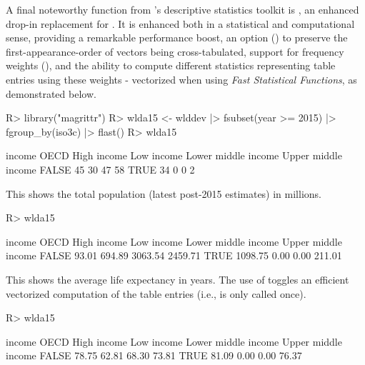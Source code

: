 \documentclass[article]{jss}
\newcommand{\fct}[1]{\code{#1()}}
\begin{document}
A final noteworthy function from 's descriptive statistics toolkit is \fct{qtab}, an enhanced drop-in replacement for . It is enhanced both in a statistical and computational sense, providing a remarkable performance boost, an option () to preserve the first-appearance-order of vectors being cross-tabulated, support for frequency weights (), and the ability to compute different statistics representing table entries using these weights - vectorized when using \emph{Fast Statistical Functions}, as demonstrated below.
%
\begin{Schunk}
\begin{Sinput}
R> library("magrittr")
R> wlda15 <- wlddev |> fsubset(year >= 2015) |> fgroup_by(iso3c) |> flast()
R> wlda15 %$% qtab(OECD, income)
\end{Sinput}
\begin{Soutput}
       income
OECD    High income Low income Lower middle income Upper middle income
  FALSE          45         30                  47                  58
  TRUE           34          0                   0                   2
\end{Soutput}
\end{Schunk}
This shows the total population (latest post-2015 estimates) in millions.
\begin{Schunk}
\begin{Sinput}
R> wlda15 %$% qtab(OECD, income, w = POP) %>% divide_by(1e6)
\end{Sinput}
\begin{Soutput}
       income
OECD    High income Low income Lower middle income Upper middle income
  FALSE       93.01     694.89             3063.54             2459.71
  TRUE      1098.75       0.00                0.00              211.01
\end{Soutput}
\end{Schunk}
This shows the average life expectancy in years. The use of \fct{fmean} toggles an efficient vectorized computation of the table entries (i.e., \fct{fmean} is only called once).
\begin{Schunk}
\begin{Sinput}
R> wlda15 %$% qtab(OECD, income, w = LIFEEX, wFUN = fmean) %>% replace_na(0)
\end{Sinput}
\begin{Soutput}
       income
OECD    High income Low income Lower middle income Upper middle income
  FALSE       78.75      62.81               68.30               73.81
  TRUE        81.09       0.00                0.00               76.37
\end{Soutput}
\end{Schunk}
\end{document}
